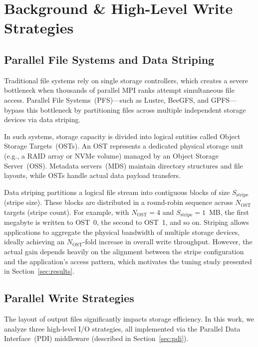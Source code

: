 \section{Background \& High-Level Write Strategies}
\label{sec:background}

\subsection{Parallel File Systems and Data Striping}
\label{sec:pfs}

Traditional file systems rely on single storage controllers, which creates a severe
bottleneck when thousands of parallel MPI ranks attempt simultaneous file access.
Parallel File Systems~(PFS)---such as Lustre, BeeGFS, and GPFS---bypass this
bottleneck by partitioning files across multiple independent storage devices via
data striping.

In such systems, storage capacity is divided into logical entities called Object
Storage Targets~(OSTs). An OST represents a dedicated physical storage unit
(e.g., a RAID array or NVMe volume) managed by an Object Storage Server~(OSS).
Metadata servers~(MDS) maintain directory structures and file layouts, while OSTs
handle actual data payload transfers.

Data striping partitions a logical file stream into contiguous blocks of size
$S_{\text{stripe}}$ (stripe size). These blocks are distributed in a round-robin
sequence across $N_{\text{OST}}$ targets (stripe count). For example, with
$N_{\text{OST}} = 4$ and $S_{\text{stripe}} = 1$~MB, the first megabyte is written
to OST~0, the second to OST~1, and so on. Striping allows applications to aggregate
the physical bandwidth of multiple storage devices, ideally achieving an
$N_{\text{OST}}$-fold increase in overall write throughput. However, the actual
gain depends heavily on the alignment between the stripe configuration and the
application's access pattern, which motivates the tuning study presented in
Section~\ref{sec:results}.

\subsection{Parallel Write Strategies}
\label{sec:strategies}

The layout of output files significantly impacts storage efficiency. In this work,
we analyze three high-level I/O strategies, all implemented via the Parallel Data
Interface~(PDI) middleware (described in Section~\ref{sec:pdi}).

